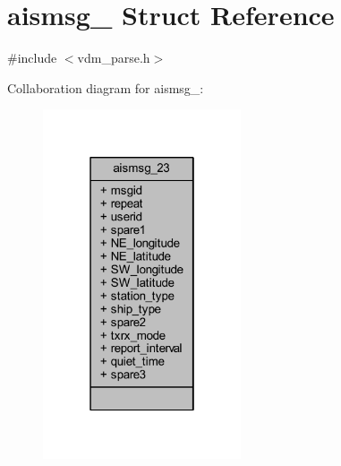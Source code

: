 \hypertarget{structaismsg__23}{}\section{aismsg\+\_ Struct Reference}
\label{structaismsg__23}


{\ttfamily \#include $<$vdm\+\_\+parse.\+h$>$}



Collaboration diagram for aismsg\+\_\+:
\nopagebreak
\begin{figure}[H]
\begin{center}
\leavevmode
\includegraphics[width=166pt]{structaismsg__23__coll__graph}
\end{center}
\end{figure}
